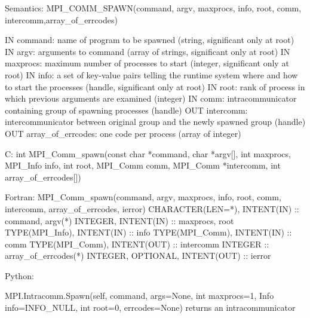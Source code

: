 Semantics:
MPI_COMM_SPAWN(command, argv, maxprocs, info, root, comm,
    intercomm,array_of_errcodes)

IN command: name of program to be spawned
    (string, significant only at root)
IN argv: arguments to command
    (array of strings, significant only at root)
IN maxprocs: maximum number of processes to start
    (integer, significant only at root)
IN info: a set of key-value pairs telling the runtime system where and
    how to start the processes (handle, significant only at root)
IN root: rank of process in which previous arguments are examined
    (integer)
IN comm: intracommunicator containing group of spawning processes
    (handle)
OUT intercomm: intercommunicator between original group and the
    newly spawned group (handle)
OUT array_of_errcodes: one code per process (array of integer)

C:
int MPI_Comm_spawn(const char *command, char *argv[], int maxprocs,
    MPI_Info info, int root, MPI_Comm comm,
    MPI_Comm *intercomm, int array_of_errcodes[])

Fortran:
MPI_Comm_spawn(command, argv, maxprocs, info, root, comm, intercomm,
array_of_errcodes, ierror)
CHARACTER(LEN=*), INTENT(IN) :: command, argv(*)
INTEGER, INTENT(IN) :: maxprocs, root
TYPE(MPI_Info), INTENT(IN) :: info
TYPE(MPI_Comm), INTENT(IN) :: comm
TYPE(MPI_Comm), INTENT(OUT) :: intercomm
INTEGER :: array_of_errcodes(*)
INTEGER, OPTIONAL, INTENT(OUT) :: ierror

Python:

MPI.Intracomm.Spawn(self,
    command, args=None, int maxprocs=1, Info info=INFO_NULL,
    int root=0, errcodes=None)
returns an intracommunicator
    

